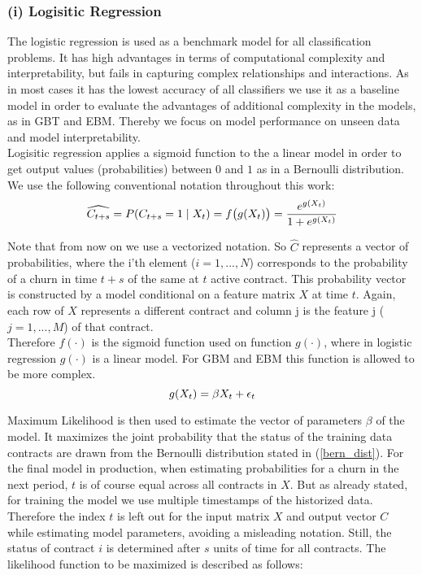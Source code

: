\documentclass[12pt,titlepage]{article}
\begin{document}
\subsubsection*{(i) Logisitic Regression}
The logistic regression is used as a benchmark model for all classification problems. It has high advantages in terms of computational complexity and interpretability, but fails in capturing complex relationships and interactions. As in most cases it has the lowest accuracy of all classifiers we use it as a baseline model in order to evaluate the advantages of additional complexity in the models, as in GBT and EBM. Thereby we focus on model performance on unseen data and model interpretability.\\
Logisitic regression applies a sigmoid function to the a linear model in order to get output values (probabilities) between $0$ and $1$ as in a Bernoulli distribution. We use the following conventional notation throughout this work: \\

\begin{equation} \label{bern_dist}
    \widehat{C_{t+s}} = P(C_{t+s}=1\mid X_{t}) = f\big(g(X_{t})\big) = \frac{e^{g(X_{t})}}{1 + e^{g(X_{t})}} \\
\end{equation}

Note that from now on we use a vectorized notation. So $\hat{C}$ represents a vector of probabilities, where the i'th element ($i = 1,...,N$) corresponds to the probability of a churn in time $t+s$ of the same at $t$ active contract. This probability vector is constructed by a model conditional on a feature matrix $X$ at time $t$. Again, each row of $X$ represents a different contract and column j is the feature j ($j = 1,...,M$) of that contract. \\
Therefore $f(\cdot)$ is the sigmoid function used on function $g(\cdot)$, where in logistic regression $g(\cdot)$ is a linear model. For GBM and EBM this function is allowed to be more complex. \\

\begin{equation} \label{lin_model}
    g(X_{t}) = \beta X_{t} + \epsilon_{t} \\
\end{equation}

Maximum Likelihood is then used to estimate the vector of parameters $\beta$ of the model. It maximizes the joint probability that the status of the training data contracts are drawn from the Bernoulli distribution stated in (\ref{bern_dist}). For the final model in production, when estimating probabilities for a churn in the next period, $t$ is of course equal across all contracts in $X$. But as already stated, for training the model we use multiple timestamps of the historized data. Therefore the index $t$ is left out for the input matrix $X$ and output vector $C$ while estimating model parameters, avoiding a misleading notation. Still, the status of contract $i$ is determined after $s$ units of time for all contracts. The likelihood function to be maximized is described as follows: \\
\end{document}

